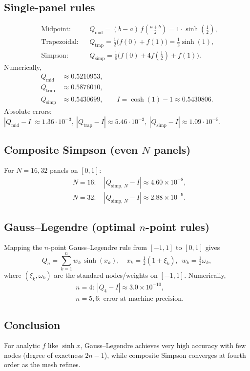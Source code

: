 \documentclass[12pt,a4paper]{article}
\theoremstyle{plain}
\theoremstyle{definition}
\theoremstyle{remark}
\theoremstyle{remark}
\begin{document}
\subsection*{Single-panel rules}
\[
\begin{aligned}
	&\text{Midpoint:} &&Q_{\mathrm{mid}}=(b-a)\,f\!\left(\tfrac{a+b}{2}\right)=1\cdot \sinh\!\left(\tfrac12\right),\\[4pt]
	&\text{Trapezoidal:} &&Q_{\mathrm{trap}}=\tfrac{1}{2}\big(f(0)+f(1)\big)=\tfrac12\sinh(1),\\[4pt]
	&\text{Simpson:} &&Q_{\mathrm{simp}}=\tfrac{1}{6}\Big(f(0)+4f\!\left(\tfrac12\right)+f(1)\Big).
\end{aligned}
\]
Numerically,
\[
\begin{aligned}
	Q_{\mathrm{mid}}&\approx 0.5210953, \\
	Q_{\mathrm{trap}}&\approx 0.5876010, \\
	Q_{\mathrm{simp}}&\approx 0.5430699, \qquad
	I=\cosh(1)-1\approx 0.5430806.
\end{aligned}
\]
Absolute errors:
\(
|Q_{\mathrm{mid}}-I|\approx 1.36\cdot 10^{-3},\
|Q_{\mathrm{trap}}-I|\approx 5.46\cdot 10^{-3},\
|Q_{\mathrm{simp}}-I|\approx 1.09\cdot 10^{-5}.
\)

\subsection*{Composite Simpson (even $N$ panels)}
For $N=16,32$ panels on $[0,1]$:
\[
\begin{aligned}
	&N=16:\quad |Q_{\mathrm{simp},\,N}-I|\approx 4.60\times 10^{-8},\\
	&N=32:\quad |Q_{\mathrm{simp},\,N}-I|\approx 2.88\times 10^{-9}.
\end{aligned}
\]

\subsection*{Gauss--Legendre (optimal $n$-point rules)}
Mapping the $n$-point Gauss--Legendre rule from $[-1,1]$ to $[0,1]$ gives
\[
Q_n=\sum_{k=1}^{n} w_k\,\sinh(x_k),\quad
x_k=\tfrac{1}{2}(1+\xi_k),\ \ w_k=\tfrac{1}{2}\omega_k,
\]
where $(\xi_k,\omega_k)$ are the standard nodes/weights on $[-1,1]$.
Numerically,
\[
\begin{aligned}
	&n=4:\ |Q_4-I|\approx 3.0\times 10^{-10},\\
	&n=5,6:\ \text{error at machine precision}.
\end{aligned}
\]
\subsection*{Conclusion}
For analytic $f$ like $\sinh x$, Gauss--Legendre achieves very high accuracy with few nodes
(degree of exactness $2n-1$), while composite Simpson converges at fourth order as the mesh refines.
\end{document}
